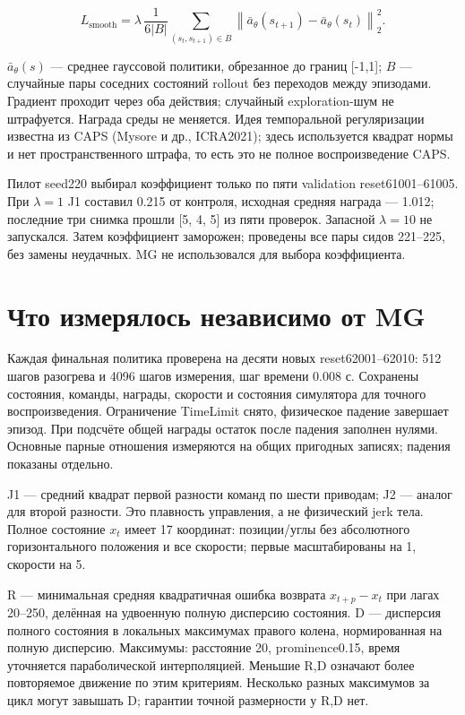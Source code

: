 \documentclass[10pt,a4paper]{article}
\begin{document}
\[
L_{\mathrm{smooth}}=\lambda\,\frac1{6|B|}\sum_{(s_t,s_{t+1})\in B}\left\|\bar a_\theta(s_{t+1})-\bar a_\theta(s_t)\right\|_2^2.
\]

$\bar a_\theta(s)$ --- среднее гауссовой политики, обрезанное до границ [-1,1]; $B$ --- случайные пары соседних состояний rollout без переходов между эпизодами. Градиент проходит через оба действия; случайный exploration-шум не штрафуется. Награда среды не меняется. Идея темпоральной регуляризации известна из CAPS (Mysore и др., ICRA2021); здесь используется квадрат нормы и нет пространственного штрафа, то есть это не полное воспроизведение CAPS.

Пилот seed220 выбирал коэффициент только по пяти validation reset61001--61005. При $\lambda=1$ J1 составил 0.215 от контроля, исходная средняя награда --- 1.012; последние три снимка прошли [5, 4, 5] из пяти проверок. Запасной $\lambda=10$ не запускался. Затем коэффициент заморожен; проведены все пары сидов 221--225, без замены неудачных. MG не использовался для выбора коэффициента.

\newpage
\section*{Что измерялось независимо от MG}

Каждая финальная политика проверена на десяти новых reset62001--62010: 512 шагов разогрева и 4096 шагов измерения, шаг времени 0.008 с. Сохранены состояния, команды, награды, скорости и состояния симулятора для точного воспроизведения. Ограничение TimeLimit снято, физическое падение завершает эпизод. При подсчёте общей награды остаток после падения заполнен нулями. Основные парные отношения измеряются на общих пригодных записях; падения показаны отдельно.

J1 --- средний квадрат первой разности команд по шести приводам; J2 --- аналог для второй разности. Это плавность управления, а не физический jerk тела. Полное состояние $x_t$ имеет 17 координат: позиции/углы без абсолютного горизонтального положения и все скорости; первые масштабированы на 1, скорости на 5.

R --- минимальная средняя квадратичная ошибка возврата $x_{t+p}-x_t$ при лагах 20--250, делённая на удвоенную полную дисперсию состояния. D --- дисперсия полного состояния в локальных максимумах правого колена, нормированная на полную дисперсию. Максимумы: расстояние 20, prominence0.15, время уточняется параболической интерполяцией. Меньшие R,D означают более повторяемое движение по этим критериям. Несколько разных максимумов за цикл могут завышать D; гарантии точной размерности у R,D нет.
\end{document}
